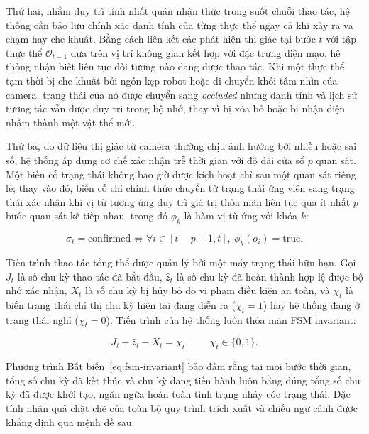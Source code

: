 Thứ hai, nhằm duy trì tính nhất quán nhận thức trong suốt chuỗi thao tác, hệ thống cần bảo lưu chính xác danh tính của từng thực thể ngay cả khi xảy ra va chạm hay che khuất. Bằng cách liên kết các phát hiện thị giác tại bước $t$ với tập thực thể $\mathcal O_{t-1}$ dựa trên vị trí không gian kết hợp với đặc trưng diện mạo, hệ thống nhận biết liên tục đối tượng nào đang được thao tác. Khi một thực thể tạm thời bị che khuất bởi ngón kẹp robot hoặc di chuyển khỏi tầm nhìn của camera, trạng thái của nó được chuyển sang \textit{occluded} nhưng danh tính và lịch sử tương tác vẫn được duy trì trong bộ nhớ, thay vì bị xóa bỏ hoặc bị nhận diện nhầm thành một vật thể mới.

Thứ ba, do dữ liệu thị giác từ camera thường chịu ảnh hưởng bởi nhiễu hoặc sai số, hệ thống áp dụng cơ chế xác nhận trễ thời gian với độ dài cửa sổ $p$ quan sát. Một biến cố trạng thái không bao giờ được kích hoạt chỉ sau một quan sát riêng lẻ; thay vào đó, biến cố chỉ chính thức chuyển từ trạng thái ứng viên sang trạng thái xác nhận khi vị từ tương ứng duy trì giá trị thỏa mãn liên tục qua ít nhất $p$ bước quan sát kế tiếp nhau, trong đó $\phi_k$ là hàm vị từ ứng với khóa $k$:

\begin{equation}
\sigma_t = \text{confirmed} \iff \forall i \in [t - p + 1, t],\ \phi_k(o_i) = \text{true}.
\label{eq:temporal-hysteresis}
\end{equation}

Tiến trình thao tác tổng thể được quản lý bởi một máy trạng thái hữu hạn. Gọi $J_t$ là số chu kỳ thao tác đã bắt đầu, $\hat z_t$ là số chu kỳ đã hoàn thành hợp lệ được bộ nhớ xác nhận, $X_t$ là số chu kỳ bị hủy bỏ do vi phạm điều kiện an toàn, và $\chi_t$ là biến trạng thái chỉ thị chu kỳ hiện tại đang diễn ra ($\chi_t = 1$) hay hệ thống đang ở trạng thái nghỉ ($\chi_t = 0$). Tiến trình của hệ thống luôn thỏa mãn FSM invariant:

\begin{equation}
J_t - \hat z_t - X_t = \chi_t,\qquad \chi_t \in \{0, 1\}.
\label{eq:fsm-invariant}
\end{equation}

Phương trình Bất biến~\eqref{eq:fsm-invariant} bảo đảm rằng tại mọi bước thời gian, tổng số chu kỳ đã kết thúc và chu kỳ đang tiến hành luôn bằng đúng tổng số chu kỳ đã được khởi tạo, ngăn ngừa hoàn toàn tình trạng nhảy cóc trạng thái. Đặc tính nhân quả chặt chẽ của toàn bộ quy trình trích xuất và chiếu ngữ cảnh được khẳng định qua mệnh đề sau.


